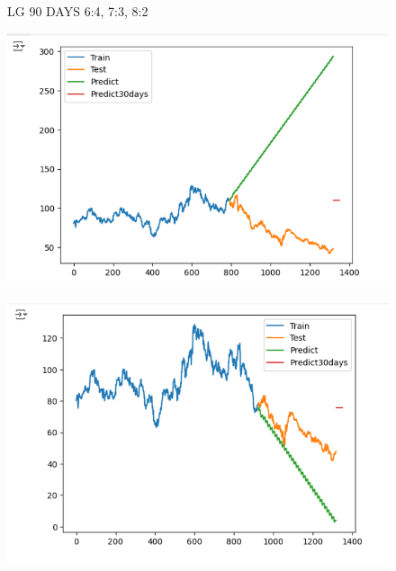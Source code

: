\documentclass{article}
\begin{document}
\begin{multicols}{2}
\begin{figure}[H]
\begin{minipage}{0.15\textwidth}
    \label{fig:3}
    \end{minipage}
    \caption{LG 90 DAYS  6:4, 7:3, 8:2 }
\end{figure}

\begin{figure}[H]
    \centering
    \begin{minipage}{0.15\textwidth}
    \centering
    \includegraphics[width=1\textwidth]{Image/ARIMA/30_6_4_SONY_Arima.png}
   
    \label{fig:1}
    \end{minipage}%
    \begin{minipage}{0.15\textwidth}
    \centering
    \includegraphics[width=1\textwidth]{Image/ARIMA/30_7_3_SONY_Arima.png}
  

\end{minipage}
\end{figure}
\end{multicols}
\end{document}
